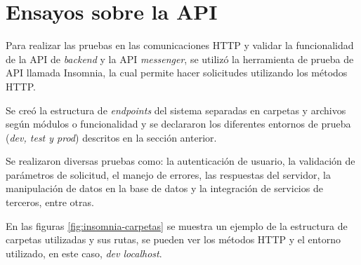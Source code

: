 \section{Ensayos sobre la API}
\label{sec:ensayos-api}

Para realizar las pruebas en las comunicaciones HTTP y validar la funcionalidad de la API de \textit{backend} y la API \textit{messenger}, se utilizó la herramienta de prueba de API llamada Insomnia, la cual permite hacer solicitudes utilizando los métodos HTTP.

Se creó la estructura de \textit{endpoints} del sistema separadas en carpetas y archivos según módulos o funcionalidad y se declararon los diferentes entornos de prueba (\textit{dev, test y prod}) descritos en la sección anterior. 

Se realizaron diversas pruebas como: la autenticación de usuario, la validación de parámetros de solicitud, el manejo de errores, las respuestas del servidor, la manipulación de datos en la base de datos y la integración de servicios de terceros, entre otras.

En las figuras \ref{fig:insomnia-carpetas} se muestra un ejemplo de la estructura de carpetas utilizadas y sus rutas, se pueden ver los métodos HTTP y el entorno utilizado, en este caso, \textit{dev localhost}.

